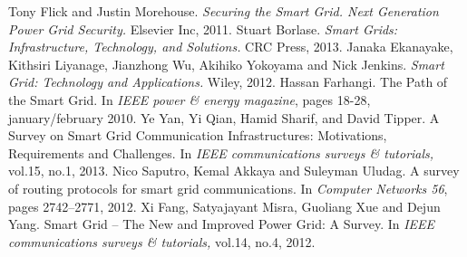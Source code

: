 \documentclass[11pt,oneside]{book}
\begin{document}
\begin{thebibliography}{99}
 Tony Flick and Justin Morehouse. \emph{Securing the Smart Grid. Next Generation Power Grid Security.} Elsevier Inc, 2011.
 Stuart Borlase. \emph{Smart Grids: Infrastructure, Technology, and Solutions.} CRC Press, 2013.
 Janaka Ekanayake, Kithsiri Liyanage, Jianzhong Wu, Akihiko Yokoyama and Nick Jenkins. \emph{Smart Grid: Technology and Applications.} Wiley, 2012.
 Hassan Farhangi. The Path of the Smart Grid. In \emph{IEEE power \& energy magazine}, pages 18-28, january/february 2010.
 Ye Yan, Yi Qian, Hamid Sharif, and David Tipper. A Survey on Smart Grid Communication Infrastructures: Motivations, Requirements and Challenges. In \emph{IEEE communications surveys \& tutorials,} vol.15, no.1, 2013.
 Nico Saputro, Kemal Akkaya and Suleyman Uludag. A survey of routing protocols for smart grid communications. In \emph{Computer Networks 56}, pages 2742–2771, 2012.
 Xi Fang, Satyajayant Misra, Guoliang Xue and Dejun Yang. Smart Grid – The New and Improved Power Grid: A Survey. In \emph{IEEE communications surveys \& tutorials,} vol.14, no.4, 2012.
\end{thebibliography}

\end{document}
